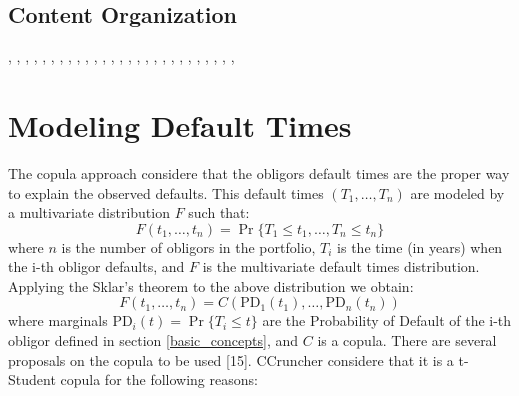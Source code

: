 \documentclass[11pt,fleqn]{book} %
\begin{document}
\section{Content Organization}

\cite{mcneil:2005}, \cite{sklar:1959}, \cite{li:2000}, 
\cite{roncalli:2001}, \cite{embrechts:2002}, \cite{cmetrics:1997},
\cite{ntzoufras:2009}, \cite{gordy:2002}, \cite{nagpal:2001},
\cite{meissner:2006}, \cite{bis:2006}, \cite{bluhm:2002},
\cite{frey:2001}, \cite{gossl:2005}, \cite{tarashev:2010},
\cite{creditrisk+:1997}, \cite{crouhy:2000}, \cite{koyluoglu:1998},
\cite{var:varbad}, \cite{var:eshortfall}, \cite{var:jorion},
\cite{basel2:2006}, \cite{kotz:2004}, \cite{garthwaite:2010},
\cite{long:2012}, \cite{kreinin:2001}, \cite{roncalli:2004},
\cite{anderson:1984}


\chapter{Modeling Default Times}

The copula approach considere that the obligors default times are the 
proper way to explain the observed defaults. This default times 
$(T_1, \dots, T_n)$ are modeled by a multivariate distribution $F$ 
such that:
\begin{displaymath}
	F(t_1, \dots, t_n) = \Pr \{T_1 \le t_1, \dots, T_n \le t_n\}
\end{displaymath}
where $n$ is the number of obligors in the portfolio, $T_i$ is the time 
(in years) when the i-th obligor defaults, and $F$ is the multivariate
default times distribution. Applying the Sklar's theorem to the above 
distribution we obtain:
\begin{displaymath}
	F(t_1, \dots, t_n) = 
	C\left(\text{PD}_1(t_1), \dots, \text{PD}_n(t_n)\right)
\end{displaymath}
where marginals $\text{PD}_i(t) = \Pr\{T_i \le t\}$ are the Probability 
of Default of the i-th obligor defined in section \ref{basic_concepts}, 
and $C$ is a copula. There are several proposals on the copula to be 
used [15]. CCruncher considere that it is a t-Student copula for the 
following reasons:
\end{document}

